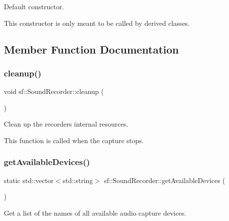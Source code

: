 Default constructor. 

This constructor is only meant to be called by derived classes. \begin{DoxyVerb}\end{DoxyVerb}
 

\subsection{Member Function Documentation}
\mbox{\label{classsf_1_1_sound_recorder_a4532acd98a33a6419e1d9f17d6a280e3}} 
\subsubsection{\texorpdfstring{cleanup()}{cleanup()}}
{\footnotesize\ttfamily void sf\+::\+Sound\+Recorder\+::cleanup (\begin{DoxyParamCaption}{ }\end{DoxyParamCaption})\hspace{0.3cm}{\ttfamily [private]}}



Clean up the recorder\textquotesingle{}s internal resources. 

This function is called when the capture stops. \begin{DoxyVerb}\end{DoxyVerb}
 \mbox{\label{classsf_1_1_sound_recorder_a26198c5c11efcd61f426f326fe314afe}} 
\subsubsection{\texorpdfstring{getAvailableDevices()}{getAvailableDevices()}}
{\footnotesize\ttfamily static std\+::vector$<$std\+::string$>$ sf\+::\+Sound\+Recorder\+::get\+Available\+Devices (\begin{DoxyParamCaption}{ }\end{DoxyParamCaption})\hspace{0.3cm}{\ttfamily [static]}}



Get a list of the names of all available audio capture devices. 


